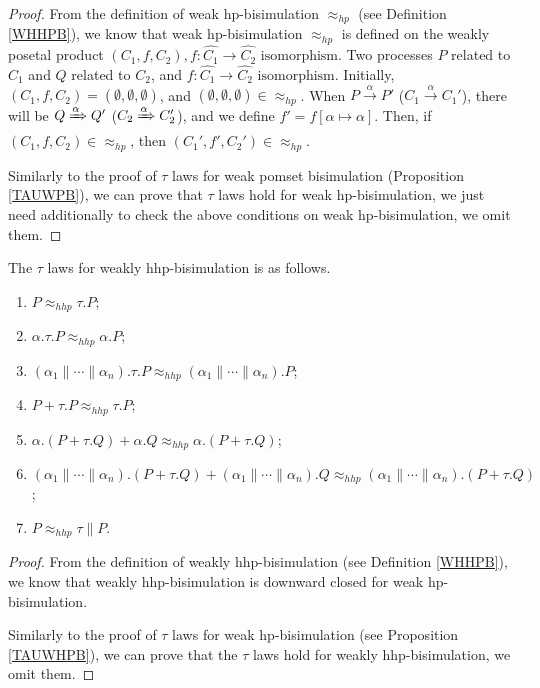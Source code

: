 \begin{proof}
From the definition of weak hp-bisimulation $\approx_{hp}$ (see Definition \ref{WHHPB}), we know that weak hp-bisimulation $\approx_{hp}$ is defined on the weakly posetal product $(C_1,f,C_2),f:\hat{C_1}\rightarrow \hat{C_2}\textrm{ isomorphism}$. Two processes $P$ related to $C_1$ and $Q$ related to $C_2$, and $f:\hat{C_1}\rightarrow \hat{C_2}\textrm{ isomorphism}$. Initially, $(C_1,f,C_2)=(\emptyset,\emptyset,\emptyset)$, and $(\emptyset,\emptyset,\emptyset)\in\approx_{hp}$. When $P\xrightarrow{\alpha}P'$ ($C_1\xrightarrow{\alpha}C_1'$), there will be $Q\xRightarrow{\alpha}Q'$ ($C_2\xRightarrow{\alpha}C_2'$), and we define $f'=f[\alpha\mapsto \alpha]$. Then, if $(C_1,f,C_2)\in\approx_{hp}$, then $(C_1',f',C_2')\in\approx_{hp}$.

Similarly to the proof of $\tau$ laws for weak pomset bisimulation (Proposition \ref{TAUWPB}), we can prove that $\tau$ laws hold for weak hp-bisimulation, we just need additionally to check the above conditions on weak hp-bisimulation, we omit them.
\end{proof}

\begin{proposition}\label{TAUWHHPB}
The $\tau$ laws for weakly hhp-bisimulation is as follows.
\begin{enumerate}
  \item $P\approx_{hhp} \tau.P$;
  \item $\alpha.\tau.P\approx_{hhp} \alpha.P$;
  \item $(\alpha_1\parallel\cdots\parallel\alpha_n).\tau.P\approx_{hhp} (\alpha_1\parallel\cdots\parallel\alpha_n).P$;
  \item $P+\tau.P\approx_{hhp} \tau.P$;
  \item $\alpha.(P+\tau.Q)+\alpha.Q\approx_{hhp}\alpha.(P+\tau.Q)$;
  \item $(\alpha_1\parallel\cdots\parallel\alpha_n).(P+\tau.Q)+ (\alpha_1\parallel\cdots\parallel\alpha_n).Q\approx_{hhp} (\alpha_1\parallel\cdots\parallel\alpha_n).(P+\tau.Q)$;
  \item $P\approx_{hhp} \tau\parallel P$.
\end{enumerate}
\end{proposition}

\begin{proof}
From the definition of weakly hhp-bisimulation (see Definition \ref{WHHPB}), we know that weakly hhp-bisimulation is downward closed for weak hp-bisimulation.

Similarly to the proof of $\tau$ laws for weak hp-bisimulation (see Proposition \ref{TAUWHPB}), we can prove that the $\tau$ laws hold for weakly hhp-bisimulation, we omit them.
\end{proof}

